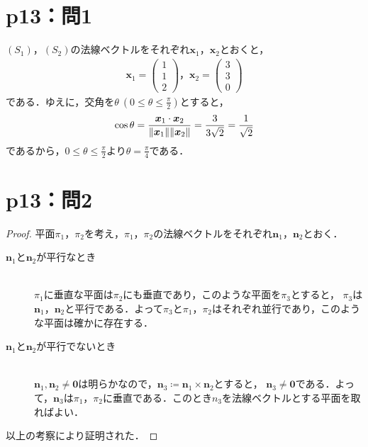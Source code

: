 \documentclass[a4paper,10pt,fleqn]{ltjsarticle}
\begin{document}
\section*{p13：問1}
%
\begin{tleftbar}
    $(S_1)$，$(S_2)$の法線ベクトルをそれぞれ$\bm{x}_1$，$\bm{x}_2$とおくと，
    \begin{gather*}
        \bm{x}_1 =
        \begin{pmatrix}
            1 \\
            1 \\
            2
        \end{pmatrix}
        ，
        \bm{x}_2 =
        \begin{pmatrix}
            3 \\
            3 \\
            0
        \end{pmatrix}
    \end{gather*}
    である．ゆえに，交角を$\theta ~(0 \le \theta \le \frac{\pi}{2})$とすると，
    \[
        \cos \theta = \frac{\bm{x}_1 \cdot \bm{x}_2}{\norm{\bm{x}_1} \norm{\bm{x}_2}}=\frac{3}{3\sqrt{2}}=\frac{1}{\sqrt{2}}
    \]
    であるから，$0 \le \theta \le \frac{\pi}{2}$より$\theta =\frac{\pi}{4}$である．
\end{tleftbar}
%
\section*{p13：問2}

\begin{tleftbar}
    \begin{proof}
        平面$\pi_1$，$\pi_2$を考え，$\pi_1$，$\pi_2$の法線ベクトルをそれぞれ$\bm{n}_1$，$\bm{n}_2$とおく．
        \begin{description}
            \item[$\bm{n}_1$と$\bm{n}_2$が平行なとき] \mbox{}\\
                  $\pi_1$に垂直な平面は$\pi_2$にも垂直であり，このような平面を$\pi_3$とすると，
                  $\pi_3$は$\bm{n}_1$，$\bm{n}_2$と平行である．よって$\pi_3$と$\pi_1$，$\pi_2$はそれぞれ並行であり，このような平面は確かに存在する．
            \item[$\bm{n}_1$と$\bm{n}_2$が平行でないとき] \mbox{} \\
                  $\bm{n}_1 , \bm{n}_2 \ne \bm{0}$は明らかなので，$\bm{n}_3 \coloneqq \bm{n}_1 \times \bm{n}_2$とすると，
                  $\bm{n}_3 \ne \bm{0}$である．よって，$\bm{n}_3$は$\pi_1$，$\pi_2$に垂直である．このとき$n_3$を法線ベクトルとする平面を取ればよい．
        \end{description}
        以上の考察により証明された．
    \end{proof}
\end{tleftbar}
\newpage
%
%
%
\end{document}
